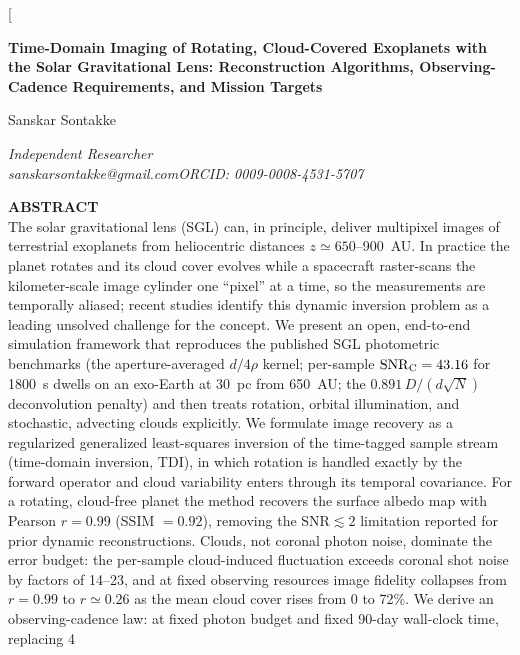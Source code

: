 ﻿\documentclass[twocolumn,10pt]{article}
\begin{document}
\twocolumn[{%
\begin{center}
{\LARGE\bfseries Time-Domain Imaging of Rotating, Cloud-Covered Exoplanets
with the Solar Gravitational Lens: Reconstruction Algorithms,
Observing-Cadence Requirements, and Mission Targets\par}
\vspace{4mm}
{\large Sanskar Sontakke\par}
\vspace{1mm}
{\small\itshape Independent Researcher\\
sanskarsontakke@gmail.com\quad ORCID: 0009-0008-4531-5707\par}
\vspace{2mm}
\vspace{4mm}
\begin{minipage}{0.86\textwidth}
\small
\textbf{ABSTRACT}\\[1mm]
The solar gravitational lens (SGL) can, in principle, deliver multipixel
images of terrestrial exoplanets from heliocentric distances
$z\simeq650$--900~AU. In practice the planet rotates and its cloud cover
evolves while a spacecraft raster-scans the kilometer-scale image cylinder
one ``pixel'' at a time, so the measurements are temporally aliased; recent
studies identify this dynamic inversion problem as a leading unsolved
challenge for the concept. We present an open, end-to-end simulation
framework that reproduces the published SGL photometric benchmarks (the
aperture-averaged $d/4\rho$ kernel; per-sample $\mathrm{SNR}_{\rm C}=43.16$
for 1800~s dwells on an exo-Earth at 30~pc from 650~AU; the
$0.891\,D/(d\sqrt{N})$ deconvolution penalty) and then treats rotation,
orbital illumination, and stochastic, advecting clouds explicitly. We
formulate image recovery as a regularized generalized least-squares
inversion of the time-tagged sample stream (time-domain inversion, TDI),
in which rotation is handled exactly by the forward operator and cloud
variability enters through its temporal covariance. For a rotating,
cloud-free planet the method recovers the surface albedo map with Pearson
$r=0.99$ (SSIM $=0.92$), removing the $\mathrm{SNR}\lesssim2$ limitation
reported for prior dynamic reconstructions. Clouds, not coronal photon
noise, dominate the error budget: the per-sample cloud-induced fluctuation
exceeds coronal shot noise by factors of 14--23, and at fixed observing
resources image fidelity collapses from $r=0.99$ to $r\simeq0.26$ as the
mean cloud cover rises from 0 to 72\%. We derive an observing-cadence
law: at fixed photon budget and fixed 90-day wall-clock time, replacing 4

\end{minipage}
\end{center}}
\end{document}
